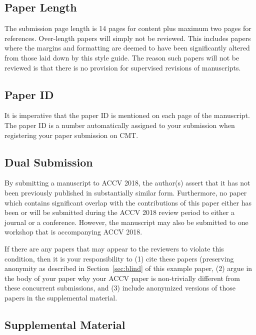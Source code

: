 \documentclass[runningheads]{llncs}
\begin{document}
\subsection{Paper Length}
The submission page length is 14 pages for content plus maximum two pages for references.
Over-length papers will
simply not be reviewed. This includes papers where the margins and
formatting are deemed to have been significantly altered from those
laid down by this style guide. The reason such papers will not be
reviewed is that there is no provision for supervised revisions of
manuscripts. 

\subsection{Paper ID}

It is imperative that the paper ID is mentioned on each page of the manuscript.
The paper ID is a number automatically assigned to your submission when 
registering your paper submission on CMT.

\subsection{Dual Submission}

By submitting a manuscript to ACCV 2018, the author(s) assert that it has
not been previously published in substantially similar
form. Furthermore, no paper which contains significant overlap with
the contributions of this paper either has been or will be submitted
during the ACCV 2018 review period to either a journal or a
conference. However, the manuscript may also be submitted to
one workshop that is accompanying ACCV 2018.

If there are any papers that may appear to the reviewers to violate
this condition, then it is your responsibility to (1) cite these
papers (preserving anonymity as described in Section~\ref{sec:blind}
of this example paper, (2) argue in the body of your paper why your
ACCV paper is non-trivially different from these concurrent
submissions, and (3) include anonymized versions of those papers in
the supplemental material.

\subsection{Supplemental Material} 
\end{document}
